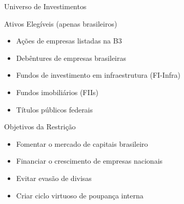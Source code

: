 \documentclass{libs/ufc_format}
\begin{document}
\begin{frame}{Universo de Investimentos}
    \begin{block}{Ativos Elegíveis (apenas brasileiros)}
        \begin{itemize}
            \item Ações de empresas listadas na B3
            \item Debêntures de empresas brasileiras
            \item Fundos de investimento em infraestrutura (FI-Infra)
            \item Fundos imobiliários (FIIs)
            \item Títulos públicos federais
        \end{itemize}
    \end{block}
    
    \vspace{0.3cm}
    
    \begin{exampleblock}{Objetivos da Restrição}
        \begin{itemize}
            \item Fomentar o mercado de capitais brasileiro
            \item Financiar o crescimento de empresas nacionais
            \item Evitar evasão de divisas
            \item Criar ciclo virtuoso de poupança interna
        \end{itemize}
    \end{exampleblock}
\end{frame}
\end{document}
